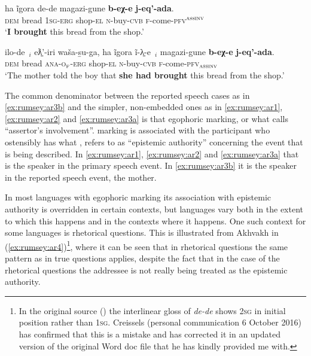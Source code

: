 \documentclass[output=paper]{langsci/langscibook}
\begin{document}
\begin{exe}
	\ex \label{ex:rumsey:ar3}
	\begin{xlist}
		\ex \label{ex:rumsey:ar3a}
		\gll ha	ĩgora de-de	magazi-gune	\textbf{b-eχ-e} \textbf{j-eq’-ada}.\\
		\textsc{dem} bread 1\textsc{sg}-\textsc{erg} shop-\textsc{el}	\textsc{n}-buy-\textsc{cvb} \textsc{f}-come-\textsc{pfv}$^{\textsc{assinv}}$\\
		\trans ‘\textbf{I brought} this bread from the shop.’
		
		\ex \label{ex:rumsey:ar3b}
		\gll ilo-de $_i$ eƛ̱’-iri waša-s̱u-ga, ha	ĩgora ĩ-λ̱-e $_i$ magazi-gune	\textbf{b-eχ-e} \textbf{j-eq’-ada}.\\
		\textsc{dem} bread \textsc{ana}-\textsc{o}$_{\textsc{f}}$-\textsc{erg} shop-\textsc{el} \textsc{n}-buy-\textsc{cvb}	\textsc{f}-come-\textsc{pfv}$_{\textsc{assinv}}$\\
		\trans ‘The mother told the boy that \textbf{she had brought} this bread from the shop.’ \\ \cite[3]{Creissels2008}
	\end{xlist}	
\end{exe}


The common denominator between the reported speech cases as in \ref{ex:rumsey:ar3b} and the simpler, non-embedded ones as in \ref{ex:rumsey:ar1}, \ref{ex:rumsey:ar2} and \ref{ex:rumsey:ar3a} is that egophoric marking, or what \citeauthor{Creissels2008} calls “assertor’s involvement”.  marking is associated with the participant who ostensibly has what \cite{Hargreaves1991}, refers to as “epistemic authority” concerning the event that is being described.  In \ref{ex:rumsey:ar1}, \ref{ex:rumsey:ar2} and \ref{ex:rumsey:ar3a} that is the speaker in the primary speech event. In \ref{ex:rumsey:ar3b} it is the speaker in the reported speech event, the mother.

In most languages with egophoric marking its association with epistemic authority is overridden in certain contexts, but languages vary both in the extent to which this happens and in the contexts where it happens. One such context for some languages is rhetorical questions. This is illustrated from Akhvakh in (\ref{ex:rumsey:ar4})\footnote{In the original source (\citealt[8]{Creissels2008}) the interlinear gloss of \textit{de-de} shows 2\textsc{sg} in initial position rather than 1\textsc{sg}. Creissels (personal communication 6 October 2016) has confirmed that this is a mistake and has corrected it in an updated version of the original Word doc file that he has kindly provided me with.}, where it can be seen that in rhetorical questions the same pattern as in true questions applies, despite the fact that in the case of the rhetorical questions the addressee is not really being treated as the epistemic authority.
\end{document}
